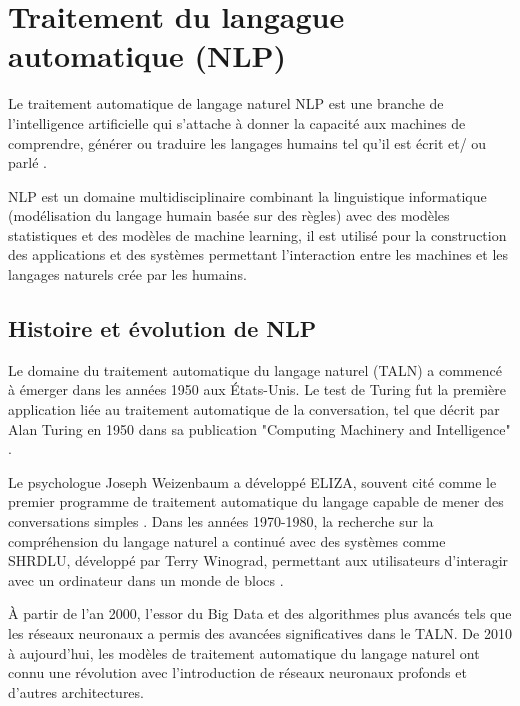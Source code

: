 \section{Traitement du langague automatique (NLP)}
Le traitement automatique de langage naturel NLP est une branche de l’intelligence artificielle qui s’attache à donner la capacité aux machines de comprendre, générer ou traduire les langages humains tel qu’il est écrit et/ ou parlé \cite{journaldunet2022nlp}. \par
NLP est un domaine multidisciplinaire combinant la linguistique informatique (modélisation du langage humain basée sur des règles) avec des modèles statistiques et des modèles de machine learning, il est utilisé pour la construction des applications et des systèmes permettant l’interaction entre les machines et les langages naturels crée par les humains. 


\subsection{Histoire et évolution de NLP}
Le domaine du traitement automatique du langage naturel (TALN) a commencé à émerger dans les années 1950 aux États-Unis. Le test de Turing fut la première application liée au traitement automatique de la conversation, tel que décrit par Alan Turing en 1950 dans sa publication "Computing Machinery and Intelligence" \cite{wikipediaTuringTest}.\par
Le psychologue Joseph Weizenbaum a développé ELIZA, souvent cité comme le premier programme de traitement automatique du langage capable de mener des conversations simples \cite{frenchwebEliza}. Dans les années 1970-1980, la recherche sur la compréhension du langage naturel a continué avec des systèmes comme SHRDLU, développé par Terry Winograd, permettant aux utilisateurs d'interagir avec un ordinateur dans un monde de blocs \cite{mediumShrdlu}. \par
À partir de l'an 2000, l'essor du Big Data et des algorithmes plus avancés tels que les réseaux neuronaux a permis des avancées significatives dans le TALN. De 2010 à aujourd'hui, les modèles de traitement automatique du langage naturel ont connu une révolution avec l'introduction de réseaux neuronaux profonds et d'autres architectures.

